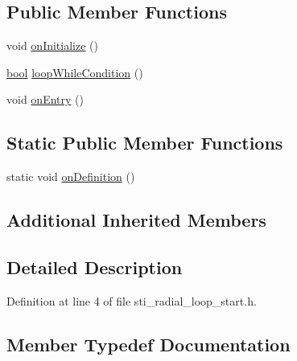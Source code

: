 \subsection*{Public Member Functions}
\begin{DoxyCompactItemize}
\item 
void \hyperlink{structsm__dance__bot__2_1_1radial__motion__states_1_1StiRadialLoopStart_a603f73cd9f5e169c12374b4c0966f901}{on\+Initialize} ()
\item 
\hyperlink{classbool}{bool} \hyperlink{structsm__dance__bot__2_1_1radial__motion__states_1_1StiRadialLoopStart_a485a0dd259979291c7318b5559bc55e8}{loop\+While\+Condition} ()
\item 
void \hyperlink{structsm__dance__bot__2_1_1radial__motion__states_1_1StiRadialLoopStart_af4ffe128f3e10d37a91f1ced8d328161}{on\+Entry} ()
\end{DoxyCompactItemize}
\subsection*{Static Public Member Functions}
\begin{DoxyCompactItemize}
\item 
static void \hyperlink{structsm__dance__bot__2_1_1radial__motion__states_1_1StiRadialLoopStart_ac7485d04c032e01de6c628eb81ab3f5b}{on\+Definition} ()
\end{DoxyCompactItemize}
\subsection*{Additional Inherited Members}


\subsection{Detailed Description}


Definition at line 4 of file sti\+\_\+radial\+\_\+loop\+\_\+start.\+h.



\subsection{Member Typedef Documentation}
